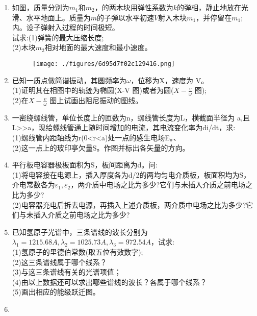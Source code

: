 
\begin{enumerate}
\item 如图，质量分别为$m_1$和$m_2$，的两木块用弹性系数为$k$的弹相，静止地放在光滑、水平地面上。质量为$m$的子弹以水平初速$V$射入木块$m_1$，并停留在$m_1$;内。设子弹射入过程的时间极短。\\
试求:(1)弹簧的最大压缩长度;\\
(2)木块$m_2$相对地面的最大速度和最小速度。
\begin{figure}[ht]
\centering
\texttt{[image: ./figures/6d95d7f02c129416.png]}
\caption{} \label{fig_SSD02_1}
\end{figure}
\item  已知一质点做简谐振动，其圆频率为$\omega$，位移为X，速度为 V。\\
(1)证明其在相图中的轨迹为椭圆(X-V 图)或者为圆($\displaystyle X-\frac{v}{\omega}$ 图);\\
(2)在$\displaystyle X-\frac{v}{\omega}$ 图上试画出阻尼振动的图线。
\item 一密绕螺线管，单位长度上的匝数为n，螺线管长度为L，横截面半径为 a,且L>>a，现给螺线管通上随时间增加的电流，其电流变化率为di/dt，求:\\
(1)螺线管内距轴线为r(0<r<a)处一点的感生电场E。、\\
(2)这一点上的玻印亭欠量S。作图并标出各矢量的方向。
\item 平行板电容器极板面积为S，板间距离为d。问:\\
(1)将电容接在电源上，插入厚度各为d/2的两均匀电介质板，板面积均为S，介电常数各为$\varepsilon_1,\varepsilon_2$，两介质中电场之比为多少?它们与未插入介质之前电场之比为多少?\\
(2)电容器充电后拆去电源，再插入上述介质板，两介质中电场之比为多少?它们与未插入介质之前电场之比为多少?
\item 已知氢原子光谱中，三条谱线的波长分别为$\lambda_1=1215.68A,\lambda_2=1025.73A,\lambda_3=972.54A$，试求:\\
(1)氢原子的里德伯常数(取五位有效数字);\\
(2)这三条谱线属于哪个线系？\\
(3)与这三条谱线有关的光谱项值；\\
(4)由以上数据还可以求出哪些谱线的波长？各属于哪个线系？\\
(5)画出相应的能级跃迁图。
\item 
\end{enumerate}
